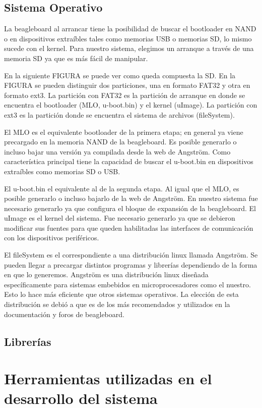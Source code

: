 \subsection{Sistema Operativo}
La beagleboard al arrancar tiene la posibilidad de buscar el bootloader en NAND o en dispositivos extraíbles tales como memorias USB o memorias SD, lo mismo sucede con el kernel. Para nuestro sistema, elegimos un arranque a través de una memoria SD ya que es más fácil de manipular.

En la siguiente FIGURA se puede ver como queda compuesta la SD.
En la FIGURA se pueden distinguir dos particiones, una en formato FAT32 y otra en formato ext3.
La partición con FAT32 es la partición de arranque en donde se encuentra el bootloader (MLO, u-boot.bin) y el kernel (uImage).
La partición con ext3 es la partición donde se encuentra el sistema de archivos (fileSystem).

El MLO es el equivalente bootloader de la primera etapa; en general ya viene precargado en la memoria NAND de la beagleboard. Es posible generarlo o incluso bajar una versión ya compilada desde la web de Angström. Como característica principal tiene la capacidad de buscar el u-boot.bin en dispositivos extraíbles como memorias SD o USB.

El u-boot.bin el equivalente al de la segunda etapa. Al igual que el MLO, es posible generarlo o incluso bajarlo de la web de Angström. En nuestro sistema fue necesario generarlo ya que configura el bloque de expansión de la beagleboard.
El uImage es el kernel del sistema. Fue necesario generarlo ya que se debieron modificar sus fuentes para que queden habilitadas las interfaces de comunicación con los dispositivos periféricos.

El fileSystem es el correspondiente a una distribución linux llamada Angström. Se pueden llegar a precargar distintos programas y librerías dependiendo de la forma en que lo generemos.
Angström es una distribución linux diseñada específicamente para sistemas embebidos en microprocesadores como el nuestro. Esto lo hace más eficiente que otros sistemas operativos. La elección de esta distribución se debió a que es de los más recomendados y utilizados en la documentación y foros de beagleboard.


\subsection{Librerías}


\section{Herramientas utilizadas en el desarrollo del sistema}


